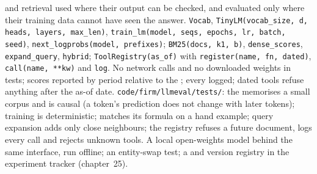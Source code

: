 \begin{build}
  and retrieval used where their output can be checked, and evaluated only where their
training data cannot have seen the answer.
 \texttt{Vocab}, \texttt{TinyLM(vocab\_size, d, heads, layers, max\_len)}, \texttt{train\_lm(model, seqs,
epochs, lr, batch, seed)}, \texttt{next\_logprobs(model, prefixes)}; \texttt{BM25(docs, k1, b)}, \texttt{dense\_scores},
\texttt{expand\_query}, \texttt{hybrid}; \texttt{ToolRegistry(as\_of)} with \texttt{register(name, fn, dated)},
\texttt{call(name, **kw)} and \texttt{log}.
 No network calls and no downloaded weights in tests; scores reported by period relative to the ; every  logged; dated tools refuse anything after the as-of date.
 \texttt{code/firm/llmeval/tests/}: the  memorises a small corpus and is causal (a
token's prediction does not change with later tokens); training is deterministic;  matches its formula on a hand example;
query expansion adds only close neighbours; the registry refuses a future document, logs every call and rejects unknown
tools.
 A local open-weights model behind the same interface, run offline; an entity-swap test; a  and version
registry in the experiment tracker (chapter~25).
\end{build}

